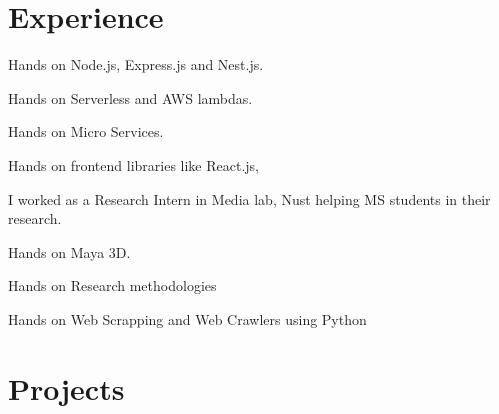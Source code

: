 \documentclass[draft=false]{deedy-resume-openfont}
\begin{document}
\begin{minipage}[t]{0.58\textwidth} 

\vspace{0.5cm}
\section{Experience}

\vspace{0.5cm}
\begin{tightemize}
\item Hands on Node.js, Express.js and Nest.js.
\item Hands on Serverless and AWS lambdas.
\item Hands on Micro Services.
\item Hands on frontend libraries like React.js, 
\end{tightemize}
\sectionsep

I worked as a Research Intern in Media lab, Nust helping MS students in their research.
\begin{tightemize}
\item Hands on Maya 3D.
\item Hands on Research methodologies
\item Hands on Web Scrapping and Web Crawlers using Python
\end{tightemize}
\sectionsep

\vspace{0.1cm}
\section{Projects}


\end{minipage}
\end{document}

